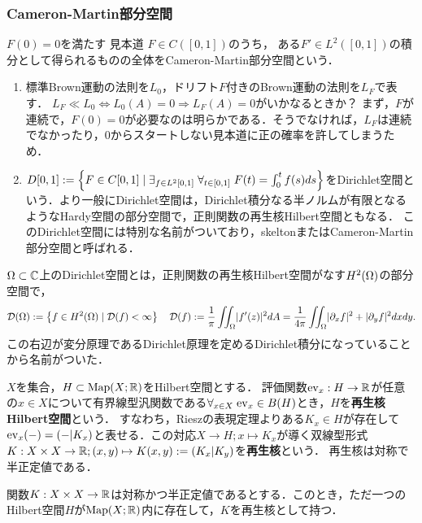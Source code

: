 \documentclass[uplatex,dvipdfmx]{jsreport}
\begin{document}
\subsubsection{Cameron-Martin部分空間}

\begin{tcolorbox}[colframe=ForestGreen, colback=ForestGreen!10!white,breakable,colbacktitle=ForestGreen!40!white,coltitle=black,fonttitle=\bfseries\sffamily,
title=]
    $F(0)=0$を満たす
    見本道
    $F\in C([0,1])$のうち，
    ある$F'\in L^2([0,1])$の積分として得られるものの全体をCameron-Martin部分空間という．
\end{tcolorbox}

\begin{notation}\mbox{}
    \begin{enumerate}
        \item 標準Brown運動の法則を$L_0$，ドリフト$F$付きのBrown運動の法則を$L_F$で表す．
        $L_F\ll L_0\Leftrightarrow L_0(A)=0\Rightarrow L_F(A)=0$がいかなるときか？
        まず，$F$が連続で，$F(0)=0$が必要なのは明らかである．そうでなければ，$L_F$は連続でなかったり，$0$からスタートしない見本道に正の確率を許してしまうため．
        \item $D[0,1]:=\left\{F\in C[0,1]\mid\exists_{f\in L^2[0,1]}\;\forall_{t\in[0,1]}\;F(t)=\int^t_0f(s)ds\right\}$をDirichlet空間という．より一般にDirichlet空間は，Dirichlet積分なる半ノルムが有限となるようなHardy空間の部分空間で，正則関数の再生核Hilbert空間ともなる．
        このDirichlet空間には特別な名前がついており，skeltonまたはCameron-Martin部分空間と呼ばれる．
    \end{enumerate}
\end{notation}

\begin{definition}
    $\Omega\subset\mathbb{C}$上のDirichlet空間とは，正則関数の再生核Hilbert空間がなす$H^2(\Omega)$の部分空間で，
    \[\mathcal{D}(\Omega):=\left\{f\in H^2(\Omega)\mid \mathcal{D}(f)<\infty\right\}\quad\mathcal{D}(f):=\frac{1}{\pi}\iint_\Omega\lvert f'(z)\rvert^2dA=\frac{1}{4\pi}\iint_\Omega\lvert\partial_xf\rvert^2+\lvert\partial_yf\rvert^2dxdy.\]
    この右辺が変分原理であるDirichlet原理を定めるDirichlet積分になっていることから名前がついた．
\end{definition}
\begin{definition}
    $X$を集合，$H\subset\mathrm{Map}(X;\mathbb{R})$をHilbert空間とする．
    評価関数$\mathrm{ev}_x:H\to\mathbb{R}$が任意の$x\in X$について有界線型汎関数である$\forall_{x\in X}\;\mathrm{ev}_x\in B(H)$とき，$H$を\textbf{再生核Hilbert空間}という．
    すなわち，Rieszの表現定理よりある$K_x\in H$が存在して$\mathrm{ev}_x(-)=(-|K_x)$と表せる．この対応$X\to H;x\mapsto K_x$が導く双線型形式$K:X\times X\to\mathbb{R};(x,y)\mapsto K(x,y):=(K_x|K_y)$を\textbf{再生核}という．
    再生核は対称で半正定値である．
\end{definition}
\begin{theorem}
    関数$K:X\times X\to\mathbb{R}$は対称かつ半正定値であるとする．このとき，ただ一つのHilbert空間$H$が$\mathrm{Map}(X;\mathbb{R})$内に存在して，$K$を再生核として持つ．
\end{theorem}
\end{document}
